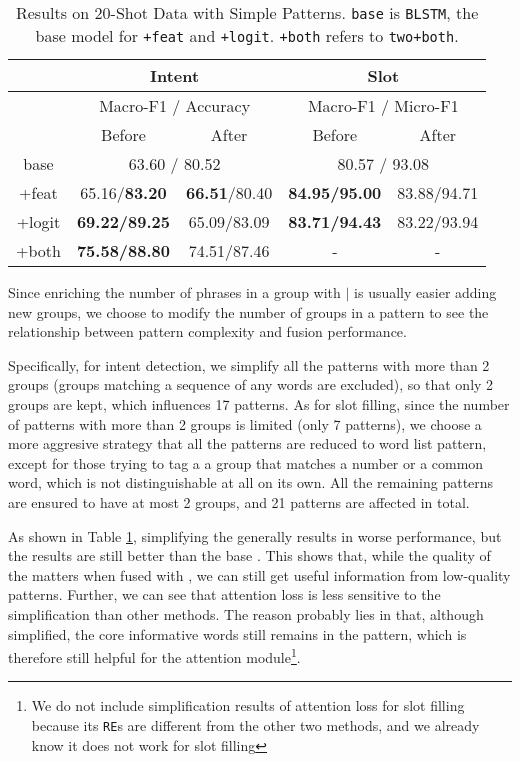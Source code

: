 \begin{table}
\setlength{\tabcolsep}{0.23em}
\centering
\small{
\begin{tabular}{|c|c|c|c|c|}

\hline
  & \multicolumn{2}{|c|}{Intent} & \multicolumn{2}{|c|}{Slot}  \\
\hline
  & \multicolumn{2}{|c|}{Macro-F1 / Accuracy} & \multicolumn{2}{|c|}{Macro-F1 / Micro-F1}  \\
\hline
  & Before & After & Before & After \\
\hline
base & \multicolumn{2}{|c|}{63.60 / 80.52} & \multicolumn{2}{|c|}{80.57 / 93.08}  \\
\hline
+feat & 65.16/\textbf{83.20} & \textbf{66.51}/80.40 & \textbf{84.95/95.00} & 83.88/94.71 \\
\hline
+logit & \textbf{69.22/89.25} & 65.09/83.09 & \textbf{83.71/94.43} & 83.22/93.94  \\
\hline
+both & \textbf{75.58/88.80} & 74.51/87.46 & - & - \\
\hline 
\end{tabular}
}
\caption{Results on 20-Shot Data with Simple Patterns. \texttt{base} is \texttt{BLSTM}, the base model for \texttt{+feat} and \texttt{+logit}. \texttt{+both} refers to \texttt{two+both}.}
\label{tab_simple}
\end{table}

Since enriching the number of phrases in a group with $|$ is usually easier adding new groups, we choose to modify the number of groups in a pattern to see the relationship between pattern complexity and fusion performance.

Specifically, for intent detection, we simplify all the patterns with more than 2 groups (groups matching a sequence of any words are excluded), so that only 2 groups are kept, which influences 17 patterns. 
As for slot filling, since the number of patterns with more than 2 groups is limited (only 7 patterns), we choose a more aggresive strategy that all the patterns are reduced to word list pattern, except for those trying to tag a a group that matches a number or a common word, which is not distinguishable at all on its own. 
All the remaining patterns are ensured to have at most 2 groups, and 21 patterns are affected in total.

As shown in Table \ref{tab_simple}, simplifying the \RE generally results in worse performance, but the results are still better than the base \BLSTM. 
This shows that, while the quality of the \RE matters when fused with \NN, we can still get useful information from low-quality patterns. Further, we can see that attention loss is less sensitive to the simplification than other methods. 
The reason probably lies in that, although simplified, the core informative words still remains in the pattern, which is therefore still helpful for the attention module\footnote{
We do not include simplification results of attention loss for slot filling because its \texttt{RE}s are different from the other two methods, and we already know it does not work for slot filling}.






